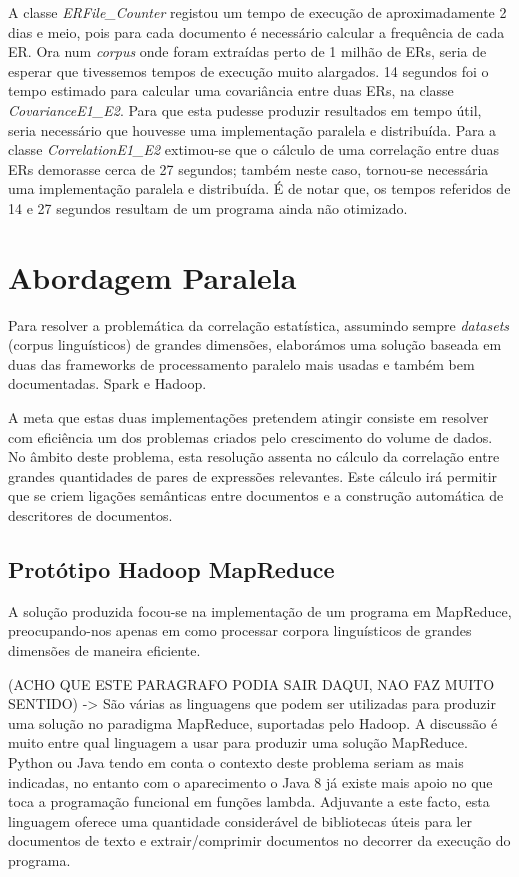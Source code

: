 A classe \textit{ERFile\_Counter} registou um tempo de execução de aproximadamente 2 dias e meio, pois para cada documento é necessário calcular a frequência de cada ER. Ora num \textit{corpus} onde foram extraídas perto de 1 milhão de ERs, seria de esperar que tivessemos tempos de execução muito alargados. 14 segundos foi o tempo estimado para calcular uma covariância entre duas ERs, na classe \textit{CovarianceE1\_E2}. Para que esta pudesse produzir resultados em tempo útil, seria necessário que houvesse uma implementação paralela e distribuída. Para a classe \textit{CorrelationE1\_E2} extimou-se que o cálculo de uma correlação entre duas ERs demorasse cerca de 27 segundos; também neste caso, tornou-se necessária uma implementação paralela e distribuída. É de notar que, os tempos referidos de 14 e 27 segundos resultam de um programa ainda não otimizado. 

\section{Abordagem Paralela}
Para resolver a problemática da correlação estatística, assumindo sempre \textit{datasets} (corpus linguísticos) de grandes dimensões, elaborámos uma solução baseada em duas das frameworks de processamento paralelo mais usadas e também bem documentadas. Spark e Hadoop.

A meta que estas duas implementações pretendem atingir consiste em resolver com eficiência um dos problemas criados pelo crescimento do volume de dados. No âmbito deste problema, esta resolução assenta no cálculo da correlação entre grandes quantidades de pares de expressões relevantes. Este cálculo irá permitir que se criem ligações semânticas entre documentos e a construção automática de descritores de documentos. 

\subsection{Protótipo Hadoop MapReduce}
A solução produzida focou-se na implementação de um programa em MapReduce, preocupando-nos apenas em como processar corpora linguísticos de grandes dimensões de maneira eficiente. 

(ACHO QUE ESTE PARAGRAFO PODIA SAIR DAQUI, NAO FAZ MUITO SENTIDO) -> São várias as linguagens que podem ser utilizadas para produzir uma solução no paradigma MapReduce, suportadas pelo Hadoop. A discussão é muito entre qual linguagem a usar para produzir uma solução MapReduce. Python ou Java tendo em conta o contexto deste problema seriam as mais indicadas, no entanto com o aparecimento o Java 8 já existe mais apoio no que toca a programação funcional em funções lambda. Adjuvante a este facto, esta linguagem oferece uma quantidade considerável de bibliotecas úteis para ler documentos de texto e extrair/comprimir documentos no decorrer da execução do programa.

